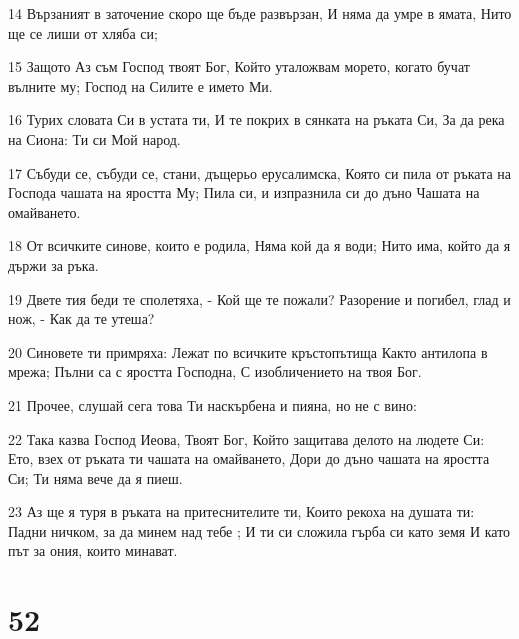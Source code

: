 \par 14 Вързаният в заточение скоро ще бъде развързан, И няма да умре в ямата, Нито ще се лиши от хляба си;
\par 15 Защото Аз съм Господ твоят Бог, Който уталожвам морето, когато бучат вълните му; Господ на Силите е името Ми.
\par 16 Турих словата Си в устата ти, И те покрих в сянката на ръката Си, За да река на Сиона: Ти си Мой народ.
\par 17 Събуди се, събуди се, стани, дъщерьо ерусалимска, Която си пила от ръката на Господа чашата на яростта Му; Пила си, и изпразнила си до дъно Чашата на омайването.
\par 18 От всичките синове, които е родила, Няма кой да я води; Нито има, който да я държи за ръка.
\par 19 Двете тия беди те сполетяха, - Кой ще те пожали? Разорение и погибел, глад и нож, - Как да те утеша?
\par 20 Синовете ти примряха: Лежат по всичките кръстопътища Както антилопа в мрежа; Пълни са с яростта Господна, С изобличението на твоя Бог.
\par 21 Прочее, слушай сега това Ти наскърбена и пияна, но не с вино:
\par 22 Така казва Господ Иеова, Твоят Бог, Който защитава делото на людете Си: Ето, взех от ръката ти чашата на омайването, Дори до дъно чашата на яростта Си; Ти няма вече да я пиеш.
\par 23 Аз ще я туря в ръката на притеснителите ти, Които рекоха на душата ти: Падни ничком, за да минем над тебе ; И ти си сложила гърба си като земя И като път за ония, които минават.

\chapter{52}

